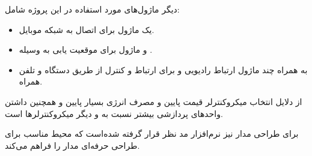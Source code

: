 \documentclass[a4paper,12pt]{report}
\begin{document}
	دیگر ماژول‌های مورد استفاده در این پروژه شامل:
	\begin{itemize}[nosep]
		\item
		یک ماژول
		برای اتصال به شبکه موبایل.
		\item
		و ماژول
		برای موقعیت یابی به وسیله
		.
		\item
		به همراه چند ماژول ارتباط رادیویی و
		برای ارتباط و کنترل از طریق دستگاه
		و تلفن همراه.
	\end{itemize}


	از دلایل انتخاب میکروکنترلر
	قیمت پایین و مصرف انرژی بسیار پایین و همچنین داشتن واحد‌های پردازشی بیشتر نسبت به
	و دیگر میکروکنترلرها است.

	برای طراحی مدار نیز نرم‌افزار
	مد نظر قرار گرفته شده‌است که محیط مناسب برای طراحی حرفه‌ای مدار را فراهم می‌کند.
%
%
%
%
%


	\nocite{*}
	
	
\end{document}
